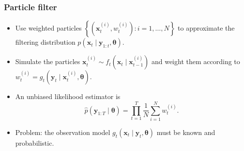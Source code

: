 \documentclass{beamer}
\newcommand{\bx}{\bm{x}}
\newcommand{\by}{\bm{y}}
\newcommand{\btheta}{\bm{\theta}}
\newcommand{\trans}{f}
\newcommand{\obs}{g}
\begin{document}
    \begin{frame}
    \frametitle{Particle filter}
    \begin{itemize}
        \item Use weighted particles $\left\{\left(\bx_t^{(i)}, w_t^{(i)}\right) : i = 1, \ldots, N\right\}$ to approximate the filtering distribution $p(\bx_t \mid \by_{1:t}, \btheta)$.
        \item Simulate the particles $\bx_t^{(i)} \sim \trans_t(\bx_t \mid \bx_{t-1}^{(i)})$ and weight them according to $w_t^{(i)} = \obs_t(\by_t \mid \bx_t^{(i)}, \btheta)$.
        \item An unbiased likelihood estimator is
        \begin{equation*}
        \widehat{p}(\by_{1:T} \mid \btheta) = \prod_{t=1}^T \frac{1}{N} \sum_{i=1}^N w_t^{(i)}.
        \end{equation*}
        \item {\color[RGB]{204,0,0} Problem: the observation model $\obs_t(\bx_t \mid \by_t, \btheta)$ must be known and probabilistic.}
    \end{itemize}
    \end{frame}
\end{document}
